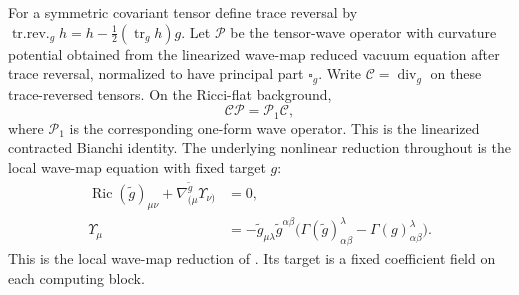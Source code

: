 For a symmetric covariant tensor define trace reversal by
$\operatorname{tr.rev.}_g h=h-\tfrac12(\operatorname{tr}_g h)g$.
Let $\mathcal P$ be the tensor-wave operator with curvature
potential obtained from the linearized wave-map reduced vacuum
equation after trace reversal, normalized to have principal part
$\square_g$.  Write $\mathcal C=\operatorname{div}_g$ on these
trace-reversed tensors.  On the Ricci-flat background,
\begin{equation}\label{bg:linear-bianchi}
                     \mathcal C\mathcal P=\mathcal P_1\mathcal C,
\end{equation}
where $\mathcal P_1$ is the corresponding one-form wave operator.
This is the linearized contracted Bianchi identity.  The underlying
nonlinear reduction throughout is the local wave-map equation with
fixed target $g$:
\begin{equation}\label{bg:wave-reduction}
\begin{split}
 \operatorname{Ric}(\widetilde g)_{\mu\nu}
       +\nabla^{\widetilde g}_{(\mu}\Upsilon_{\nu)}&=0,\\
 \Upsilon_\mu&=-\widetilde g_{\mu\lambda}
 \widetilde g^{\alpha\beta}
 \bigl(\Gamma(\widetilde g)^\lambda_{\alpha\beta}
                         -\Gamma(g)^\lambda_{\alpha\beta}\bigr).
\end{split}
\end{equation}
This is the local wave-map reduction of \cite[]{Foundation}.
Its target is a fixed coefficient field on each computing block.

